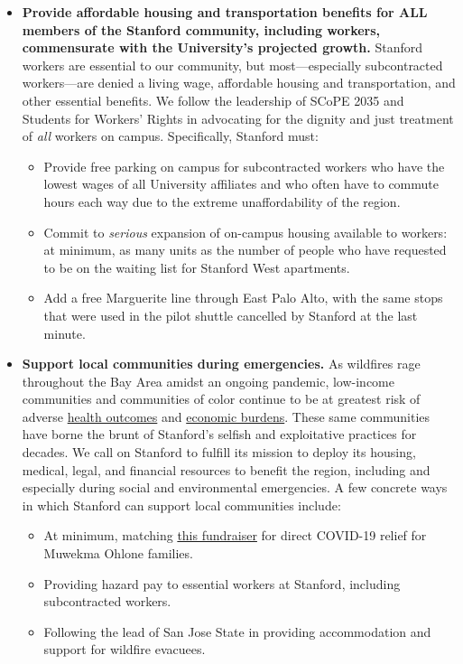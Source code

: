 \documentclass[12pt, titlepage, letterpaper]{article}
\begin{document}
\begin{itemize}[itemsep=1em]
    \item \textbf{Provide affordable housing and transportation benefits for ALL members of the Stanford community, including workers, commensurate with the University’s projected growth.} Stanford workers are essential to our community, but most---especially subcontracted workers---are denied a living wage, affordable housing and transportation, and other essential benefits. We follow the leadership of SCoPE 2035 and Students for Workers’ Rights in advocating for the dignity and just treatment of \textit{all} workers on campus. Specifically, Stanford must:
        \begin{itemize}
            \item Provide free parking on campus for subcontracted workers who have the lowest wages of all University affiliates and who often have to commute hours each way due to the extreme unaffordability of the region.
            \item Commit to \textit{serious} expansion of on-campus housing available to workers: at minimum, as many units as the number of people who have requested to be on the waiting list for Stanford West apartments. 
            \item Add a free Marguerite line through East Palo Alto, with the same stops that were used in the pilot shuttle cancelled by Stanford at the last minute.
        \end{itemize}
    
    \item \textbf{Support local communities during emergencies.} As wildfires rage throughout the Bay Area amidst an ongoing pandemic, low-income communities and communities of color continue to be at greatest risk of adverse \href{https://www.phi.org/press/wildfire-smoke-poses-greatest-risk-to-low-income-residents-people-of-color-experts-say/}{health outcomes} and \href{http://latogether.org/2020/08/26/calfires/}{economic burdens}. These same communities have borne the brunt of Stanford’s selfish and exploitative practices for decades. We call on Stanford to fulfill its mission to deploy its housing, medical, legal, and financial resources to benefit the region, including and especially during social and environmental emergencies. A few concrete ways in which Stanford can support local communities include: 
    \begin{itemize}
        \item At minimum, matching \href{https://charity.gofundme.com/o/en/campaign/covid-19-relief-for-muwekma-ohlone-families?fbclid=IwAR17ULCWJcv0rqeQQOFQ71UY3zhUmLTiC1Bivzro2KvVh4e2mJ-fq_E8y2E}{this fundraiser} for direct COVID-19 relief for Muwekma Ohlone families.
        \item Providing hazard pay to essential workers at Stanford, including subcontracted workers.
        \item Following the lead of San Jose State in providing accommodation and support for wildfire evacuees.
    \end{itemize}

\end{itemize}
\end{document}
